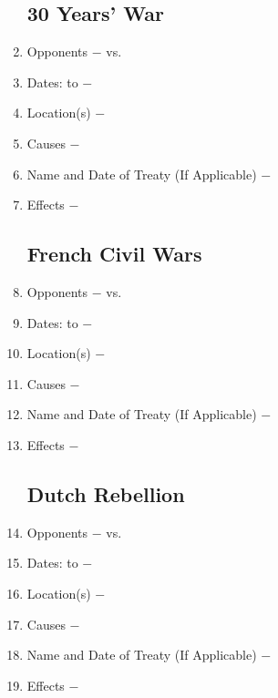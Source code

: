 \documentclass[12pt]{article}
\begin{document}
\begin{enumerate}
\subsection{30 Years' War}

\item Opponents $-$ vs.

\item Dates: to $-$

\item Location(s) $-$ 

\item Causes $-$

\item Name and Date of Treaty (If Applicable) $-$ 

\item Effects $-$

\subsection{French Civil Wars}
 
\item Opponents $-$ vs.

\item Dates: to $-$

\item Location(s) $-$ 

\item Causes $-$

\item Name and Date of Treaty (If Applicable) $-$ 

\item Effects $-$

\subsection{Dutch Rebellion}

\item Opponents $-$ vs.

\item Dates: to $-$

\item Location(s) $-$ 

\item Causes $-$

\item Name and Date of Treaty (If Applicable) $-$ 

\item Effects $-$ 


\end{enumerate}
\end{document}
